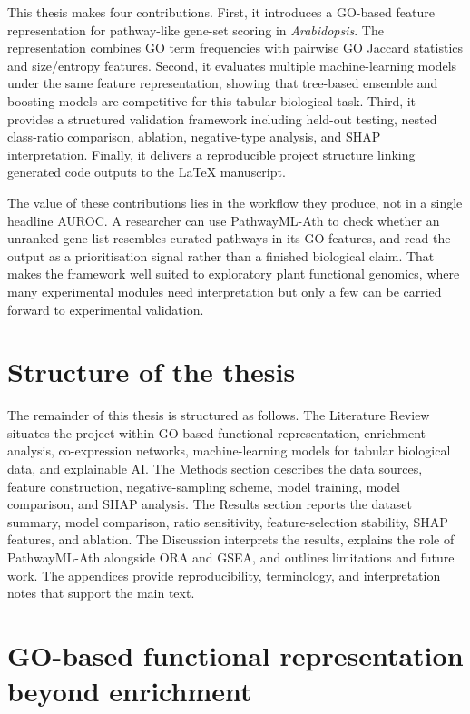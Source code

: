 \documentclass[12pt,letterpaper,oneside,openany]{book}
\begin{document}
This thesis makes four contributions. First, it introduces a GO-based feature representation for pathway-like gene-set scoring in \textit{Arabidopsis}. The representation combines GO term frequencies with pairwise GO Jaccard statistics and size/entropy features. Second, it evaluates multiple machine-learning models under the same feature representation, showing that tree-based ensemble and boosting models are competitive for this tabular biological task. Third, it provides a structured validation framework including held-out testing, nested class-ratio comparison, ablation, negative-type analysis, and SHAP interpretation. Finally, it delivers a reproducible project structure linking generated code outputs to the LaTeX manuscript.

The value of these contributions lies in the workflow they produce, not in a single headline AUROC. A researcher can use PathwayML-Ath to check whether an unranked gene list resembles curated pathways in its GO features, and read the output as a prioritisation signal rather than a finished biological claim. That makes the framework well suited to exploratory plant functional genomics, where many experimental modules need interpretation but only a few can be carried forward to experimental validation.

\section{Structure of the thesis}
\label{sec:bg_structure}

The remainder of this thesis is structured as follows. The Literature Review situates the project within GO-based functional representation, enrichment analysis, co-expression networks, machine-learning models for tabular biological data, and explainable AI. The Methods section describes the data sources, feature construction, negative-sampling scheme, model training, model comparison, and SHAP analysis. The Results section reports the dataset summary, model comparison, ratio sensitivity, feature-selection stability, SHAP features, and ablation. The Discussion interprets the results, explains the role of PathwayML-Ath alongside ORA and GSEA, and outlines limitations and future work. The appendices provide reproducibility, terminology, and interpretation notes that support the main text.

\section{GO-based functional representation beyond enrichment}
\label{sec:lit_go_extended}
\end{document}
